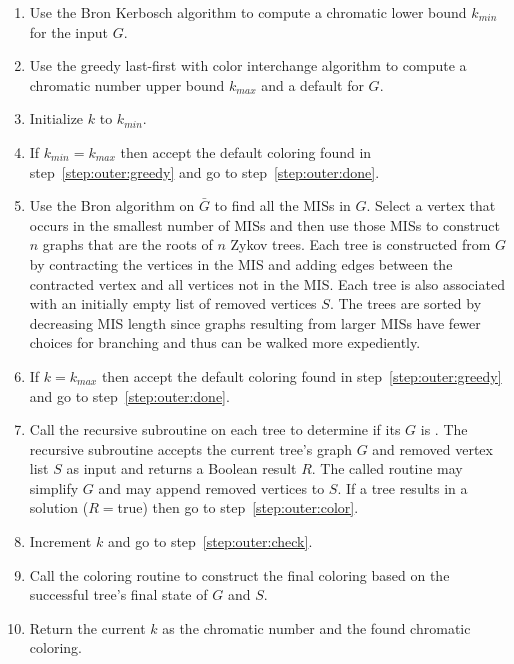 \begin{enumerate}
\item\label{step:outer:bron} Use the Bron Kerbosch algorithm to compute a chromatic lower bound \(k_{min}\)
  for the input \(G\).

\item\label{step:outer:greedy} Use the greedy last-first with color interchange algorithm to compute a chromatic
  number upper bound \(k_{max}\) and a default  for \(G\).

\item\label{step:outer:initk} Initialize \(k\) to \(k_{min}\).

\item\label{step:outer:match} If \(k_{min}=k_{max}\) then accept the default coloring found in
  step~\ref{step:outer:greedy} and go to step~\ref{step:outer:done}.

\item\label{step:outer:trees} Use the Bron algorithm on \(\bar{G}\) to find all the MISs in \(G\).  Select a vertex
  that occurs in the smallest number of MISs and then use those MISs to construct \(n\) graphs that are the roots
  of \(n\) Zykov trees.  Each tree is constructed from \(G\) by contracting the vertices in the MIS and adding
  edges between the contracted vertex and all vertices not in the MIS.  Each tree is also associated with an
  initially empty list of removed vertices \(S\).  The trees are sorted by decreasing MIS length since graphs
  resulting from larger MISs have fewer choices for branching and thus can be walked more expediently.

\item\label{step:outer:check} If \(k=k_{max}\) then accept the default coloring found in
  step~\ref{step:outer:greedy} and go to step~\ref{step:outer:done}.

\item\label{step:outer:call} Call the recursive subroutine on each tree to determine if its \(G\) is .
  The recursive subroutine accepts the current tree's graph \(G\) and removed vertex list \(S\) as input and
  returns a Boolean result \(R\).  The called routine may simplify \(G\) and may append removed vertices to
  \(S\).  If a tree results in a solution (\(R=\)true) then go to step~\ref{step:outer:color}.

\item\label{step:outer:incrk} Increment \(k\) and go to step~\ref{step:outer:check}.

\item\label{step:outer:color} Call the coloring routine to construct the final coloring based on the successful
  tree's final state of \(G\) and \(S\).

\item\label{step:outer:done} Return the current \(k\) as the chromatic number and the found chromatic coloring.
\end{enumerate}

